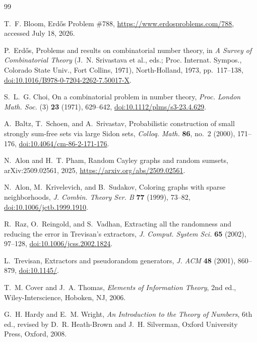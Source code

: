 \documentclass[11pt]{article}
\numberwithin{equation}{section}
\theoremstyle{definition}
\theoremstyle{remark}
\begin{document}
\begingroup
\small
\begin{thebibliography}{99}

T.~F. Bloom,
\newblock Erd\H{o}s Problem \#788,
\newblock \url{https://www.erdosproblems.com/788},
\newblock accessed July 18, 2026.

P.~Erd\H{o}s,
\newblock Problems and results on combinatorial number theory,
\newblock in \emph{A Survey of Combinatorial Theory}
(J.~N. Srivastava et al., eds.; Proc. Internat. Sympos.,
Colorado State Univ., Fort Collins, 1971),
North-Holland, 1973, pp.~117--138,
\newblock \href{https://doi.org/10.1016/B978-0-7204-2262-7.50017-X}
{doi:10.1016/B978-0-7204-2262-7.50017-X}.

S.~L.~G. Choi,
\newblock On a combinatorial problem in number theory,
\newblock \emph{Proc. London Math. Soc.} (3) \textbf{23} (1971), 629--642,
\newblock \href{https://doi.org/10.1112/plms/s3-23.4.629}
{doi:10.1112/plms/s3-23.4.629}.

A.~Baltz, T.~Schoen, and A.~Srivastav,
\newblock Probabilistic construction of small strongly sum-free sets via
large Sidon sets,
\newblock \emph{Colloq. Math.} \textbf{86}, no.~2 (2000), 171--176,
\newblock \href{https://doi.org/10.4064/cm-86-2-171-176}
{doi:10.4064/cm-86-2-171-176}.

N.~Alon and H.~T. Pham,
\newblock Random Cayley graphs and random sumsets,
\newblock arXiv:2509.02561, 2025,
\newblock \url{https://arxiv.org/abs/2509.02561}.

N.~Alon, M.~Krivelevich, and B.~Sudakov,
\newblock Coloring graphs with sparse neighborhoods,
\newblock \emph{J. Combin. Theory Ser. B} \textbf{77} (1999), 73--82,
\newblock \href{https://doi.org/10.1006/jctb.1999.1910}
{doi:10.1006/jctb.1999.1910}.

R.~Raz, O.~Reingold, and S.~Vadhan,
\newblock Extracting all the randomness and reducing the error in
Trevisan's extractors,
\newblock \emph{J. Comput. System Sci.} \textbf{65} (2002), 97--128,
\newblock \href{https://doi.org/10.1006/jcss.2002.1824}
{doi:10.1006/jcss.2002.1824}.

L.~Trevisan,
\newblock Extractors and pseudorandom generators,
\newblock \emph{J. ACM} \textbf{48} (2001), 860--879,
\newblock \href{https://doi.org/10.1145/502090.502099}
{doi:10.1145/}.

T.~M. Cover and J.~A. Thomas,
\newblock \emph{Elements of Information Theory}, 2nd ed.,
Wiley-Interscience, Hoboken, NJ, 2006.

G.~H. Hardy and E.~M. Wright,
\newblock \emph{An Introduction to the Theory of Numbers}, 6th ed.,
revised by D.~R. Heath-Brown and J.~H. Silverman,
Oxford University Press, Oxford, 2008.

\end{thebibliography}
\endgroup
\end{document}
